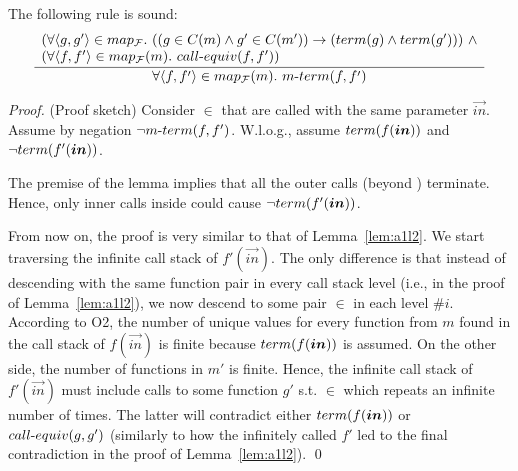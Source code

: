 \begin{lemma}\label{lem:a1l3}
The following rule is sound:
\[
\frac
{\begin{array}{l}
(\forall{\langle g,g'\rangle} \in map_{\cal F}.\ (\left(g \in C(m) \land g' \in C(m')\right) \rightarrow \left(term(g) \land term(g')\right))\ \land \\
(\forall {\langle f,f'\rangle} \in map_{\cal F}(m).\ call\mbox{-}equiv{(f, f'}))
\end{array}
}
{\forall {\langle f,f'\rangle} \in map_{\cal F}(m).\  m\mbox{-}term{(f, f'})}
\]
\end{lemma}

\begin{proof}
(Proof sketch) Consider $\in$  that are called with the same parameter
$\vec{in}$. Assume by negation $\lnot m\mbox{-}term{(f, f'})$. W.l.o.g., assume $\term{f(\vec{in})}$
 and  $\lnot\term{f'(\vec{in})}$.

The premise of the lemma implies that all the outer calls (beyond ) terminate. Hence, only inner calls inside  could cause $\lnot\term{f'(\vec{in})}$.

From now on, the proof is very similar to that of Lemma~\ref{lem:a1l2}. We start traversing
the infinite call stack of $f'(\vec{in})$. The only difference is
that instead of descending with the same function pair in every call stack level
(i.e.,  in the proof of Lemma~\ref{lem:a1l2}), we now descend to some pair  $\in$  in each level $\#i$.
According to O2, the number of unique values for
every function from $m$ found in the call stack of $f(\vec{in})$ is finite
because $\term{f(\vec{in})}$ is assumed. On the other side,
the number of functions in $m'$ is finite. Hence, the infinite call
stack of $f'(\vec{in})$ must include calls to some function $g'$ s.t.  $\in$  which repeats an
infinite number of times. The latter will contradict either $\term{f(\vec{in})}$ or $call\mbox{-}equiv{(g, g'})$ (similarly to how the infinitely called $f'$ led to the final contradiction in the proof of Lemma~\ref{lem:a1l2}).
\qed
\end{proof}


